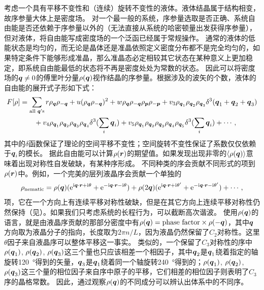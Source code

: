 \documentclass[hyperref, UTF8, a4paper]{ctexart}
\newcommand*{\ii}{\mathrm{i}}
\newcommand*{\ee}{\mathrm{e}}
\begin{document}
考虑一个具有平移不变性和（连续）旋转不变性的液体。液体结晶属于结构相变，故序参量大体上是密度场。
对一个最一般的系统，序参量选取是否正确、系统自由能是否还依赖于序参量以外的（无法直接从系统的哈密顿量出发获得序参量），但对液体，将自由能写成密度场的一个泛函已经属于常规操作\cite{Evans_2016,cdft2020}。
通常的液体的低能状态是均匀的，而无论是晶体还是准晶依照定义密度分布都不是完全均匀的，如果特定条件下能够形成准晶，那么准晶态必定相较其它状态在某种意义上更加稳定，即系统自由能最低的状态将不再是密度处处为常数的状态。
因此可以将密度场的$\vb*{q} \neq 0$的傅里叶分量$\rho(\vb*{q})$视作结晶的序参量。根据涉及的波矢的个数，液体的自由能的展开式子形如下式：
\begin{equation}
    \begin{aligned}
        F[\rho] &= \sum_\text{all $\vb*{q}$'s} r \rho_{\vb*{q}} \rho_{- \vb*{q}} + u (\rho_{\vb*{q}} \rho_{- \vb*{q}})^2 
        + w \rho_{\vb*{q}} \rho_{- \vb*{q}} \rho_{\vb*{p}} \rho_{- \vb*{p}} 
        + v_3 \rho_{\vb*{q}_1} \rho_{\vb*{q}_2} \rho_{\vb*{q}_3} \delta^3(\vb*{q}_1 + \vb*{q}_2 + \vb*{q}_3) \\
        &\quad \quad + v_4 \rho_{\vb*{q}_1} \rho_{\vb*{q}_2} \rho_{\vb*{q}_3} \rho_{\vb*{q}_4} \delta^3(\sum_i \vb*{q}_i) 
        + v_5 \rho_{\vb*{q}_1} \rho_{\vb*{q}_2} \rho_{\vb*{q}_3} \rho_{\vb*{q}_4} \rho_{\vb*{q}_5}
        \delta^3(\sum_i \vb*{q}_i) + \cdots,
    \end{aligned}
    \label{eq:free-energy-static}
\end{equation}
其中的$\delta$函数保证了理论的空间平移不变性；空间旋转不变性保证了系数仅仅依赖于$\vb*{q}_i$的模长。
据此自由能可以计算$\rho(\vb*{r})$的期望值。如果发现出现非零的$\expval{\rho(\vb*{q})}$意味着出现对称性自发破缺，有某种序形成。
不同种类的序会贡献不同形式的项到$\rho(\vb*{r})$中。例如，一个完美的层列液晶序会贡献一个单独的
\begin{equation}
    \rho_\text{nematic} = \rho(\vb*{q}) (\ee^{\ii \vb*{q} \cdot \vb*{r} + \ii \theta } + \ee^{- \ii \vb*{q} \cdot \vb*{r} - \ii \theta } ) + \rho(2\vb*{q}) (\ee^{\ii \vb*{q} \cdot \vb*{r} + \ii \theta' } + \ee^{- \ii \vb*{q} \cdot \vb*{r} - \ii \theta' } ) + \cdots,
\end{equation}
项，它在一个方向上有连续平移对称性破缺，但是在其它方向上连续平移对称性仍然保持（见）。如果我们只考虑系统的长程行为，可以截断高次谐波。
使用$\rho(\vb*{q})$的语言，就是由液晶序贡献的那部分密度中有$\rho(\vb*{q}) = \text{phase factor} \times \rho(-\vb*{q})$，其中$\vb*{q}$方向取为液晶分子的指向，长度取为$2\pi n/ L$，因为液晶仍然保留了$C_2$对称性。这里$\theta$因子来自液晶序可以整体平移这一事实。
类似的，一个保留了$C_3$对称性的序中$\rho(\vb*{q}_1)$, $\rho(\vb*{q}_2)$, $\rho(\vb*{q}_3)$这三个量也只应该相差一个相因子，其中$\vb*{q}_2$是$\vb*{q}_1$绕着指定的轴旋转\SI{120}{\degree}得到的矢量，$\vb*{q}_3$是$\vb*{q}_1$绕着同一个轴旋转\SI{240}{\degree}得到的；$\rho(\vb*{q}_1)$, $\rho(\vb*{q}_2)$, $\rho(\vb*{q}_3)$这三个量的相位因子来自序中原子的平移，它们相差的相位因子则表明了$C_3$序的晶格常数。
因此，通过观察$\rho(\vb*{q})$的不同成分可以辨认出体系中的不同序。
\end{document}
